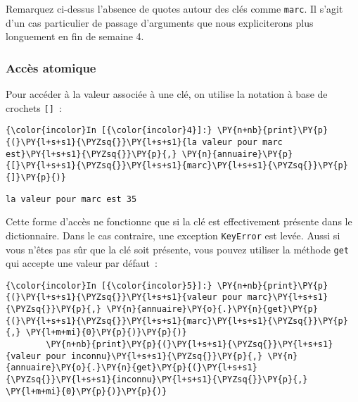     Remarquez ci-dessus l'absence de quotes autour des clés comme
\texttt{marc}. Il s'agit d'un cas particulier de passage d'arguments que
nous expliciterons plus longuement en fin de semaine 4.

    \hypertarget{accuxe8s-atomique}{%
\subsubsection{Accès atomique}\label{accuxe8s-atomique}}

    Pour accéder à la valeur associée à une clé, on utilise la notation à
base de crochets \texttt{{[}{]}}~:

    \begin{Verbatim}[commandchars=\\\{\},frame=single,framerule=0.3mm,rulecolor=\color{cellframecolor}]
{\color{incolor}In [{\color{incolor}4}]:} \PY{n+nb}{print}\PY{p}{(}\PY{l+s+s1}{\PYZsq{}}\PY{l+s+s1}{la valeur pour marc est}\PY{l+s+s1}{\PYZsq{}}\PY{p}{,} \PY{n}{annuaire}\PY{p}{[}\PY{l+s+s1}{\PYZsq{}}\PY{l+s+s1}{marc}\PY{l+s+s1}{\PYZsq{}}\PY{p}{]}\PY{p}{)}
\end{Verbatim}


    \begin{Verbatim}[commandchars=\\\{\},frame=single,framerule=0.3mm,rulecolor=\color{cellframecolor}]
la valeur pour marc est 35
\end{Verbatim}

    Cette forme d'accès ne fonctionne que si la clé est effectivement
présente dans le dictionnaire. Dans le cas contraire, une exception
\texttt{KeyError} est levée. Aussi si vous n'êtes pas sûr que la clé
soit présente, vous pouvez utiliser la méthode \texttt{get} qui accepte
une valeur par défaut~:

    \begin{Verbatim}[commandchars=\\\{\},frame=single,framerule=0.3mm,rulecolor=\color{cellframecolor}]
{\color{incolor}In [{\color{incolor}5}]:} \PY{n+nb}{print}\PY{p}{(}\PY{l+s+s1}{\PYZsq{}}\PY{l+s+s1}{valeur pour marc}\PY{l+s+s1}{\PYZsq{}}\PY{p}{,} \PY{n}{annuaire}\PY{o}{.}\PY{n}{get}\PY{p}{(}\PY{l+s+s1}{\PYZsq{}}\PY{l+s+s1}{marc}\PY{l+s+s1}{\PYZsq{}}\PY{p}{,} \PY{l+m+mi}{0}\PY{p}{)}\PY{p}{)}
        \PY{n+nb}{print}\PY{p}{(}\PY{l+s+s1}{\PYZsq{}}\PY{l+s+s1}{valeur pour inconnu}\PY{l+s+s1}{\PYZsq{}}\PY{p}{,} \PY{n}{annuaire}\PY{o}{.}\PY{n}{get}\PY{p}{(}\PY{l+s+s1}{\PYZsq{}}\PY{l+s+s1}{inconnu}\PY{l+s+s1}{\PYZsq{}}\PY{p}{,} \PY{l+m+mi}{0}\PY{p}{)}\PY{p}{)}
\end{Verbatim}


